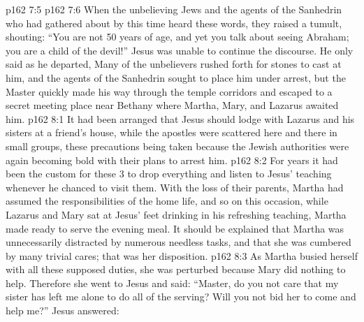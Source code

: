 \vs p162 7:5 
\vs p162 7:6 \pc When the unbelieving Jews and the agents of the Sanhedrin who had gathered about by this time heard these words, they raised a tumult, shouting: “You are not 50 years of age, and yet you talk about seeing Abraham; you are a child of the devil!” Jesus was unable to continue the discourse. He only said as he departed,  Many of the unbelievers rushed forth for stones to cast at him, and the agents of the Sanhedrin sought to place him under arrest, but the Master quickly made his way through the temple corridors and escaped to a secret meeting place near Bethany where Martha, Mary, and Lazarus awaited him.
\vs p162 8:1 It had been arranged that Jesus should lodge with Lazarus and his sisters at a friend’s house, while the apostles were scattered here and there in small groups, these precautions being taken because the Jewish authorities were again becoming bold with their plans to arrest him.
\vs p162 8:2 For years it had been the custom for these 3 to drop everything and listen to Jesus’ teaching whenever he chanced to visit them. With the loss of their parents, Martha had assumed the responsibilities of the home life, and so on this occasion, while Lazarus and Mary sat at Jesus’ feet drinking in his refreshing teaching, Martha made ready to serve the evening meal. It should be explained that Martha was unnecessarily distracted by numerous needless tasks, and that she was cumbered by many trivial cares; that was her disposition.
\vs p162 8:3 As Martha busied herself with all these supposed duties, she was perturbed because Mary did nothing to help. Therefore she went to Jesus and said: “Master, do you not care that my sister has left me alone to do all of the serving? Will you not bid her to come and help me?” Jesus answered: 
